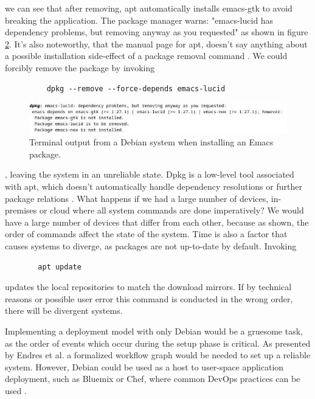 we can see that after removing, apt automatically installs emacs-gtk
to avoid breaking the application. The package manager warns:
"emacs-lucid has dependency problems, but removing anyway as you
requested" as shown in figure \ref{deb_remove}. It's also noteworthy,
that the manual page for apt, doesn't say anything about a possible
installation side-effect of a package removal command
\cite{ubuntuUbuntuManpage}. We could forcibly remove the package by
invoking
\begin{figure}[H]\label{dpkgsnippet}
\begin{lstlisting} 
    dpkg --remove --force-depends emacs-lucid
\end{lstlisting}
\end{figure}
\begin{figure}\label{deb_remove}
\includegraphics[scale=2.0]{latex/kuvat/cropped_apt_output.jpg}
\caption{Terminal output from a Debian system when installing an Emacs package.}
\end{figure}
, leaving the system in an unreliable state. Dpkg is a low-level
tool associated with apt, which doesn't automatically handle dependency
resolutions or further package relations
\cite{thiruvathukal2004gentoo}. What happens if we had a large number
of devices, in-premises or cloud where all system commands are done
imperatively? We would have a large number of devices that differ from
each other, because as shown, the order of commands affect the state
of the system. Time is also a factor that
causes systems to diverge, as packages are not up-to-date by
default. Invoking 
\begin{figure}[H]\label{aptupdate}
\begin{lstlisting} 
  apt update
\end{lstlisting}
\end{figure}
updates the local repositories to match the download mirrors. If by
technical reasons or possible user error this command is conducted in
the wrong order, there will be divergent systems.

Implementing a deployment model with only Debian would be a gruesome
task, as the order of events which occur during the setup phase is
critical. As presented by Endres et al. a formalized workflow graph
would be needed to set up a reliable system. However, Debian could
be used as a host to user-space application deployment, such as
Bluemix or Chef, where common DevOps practices can be used
\cite{endres2017declarative}.


